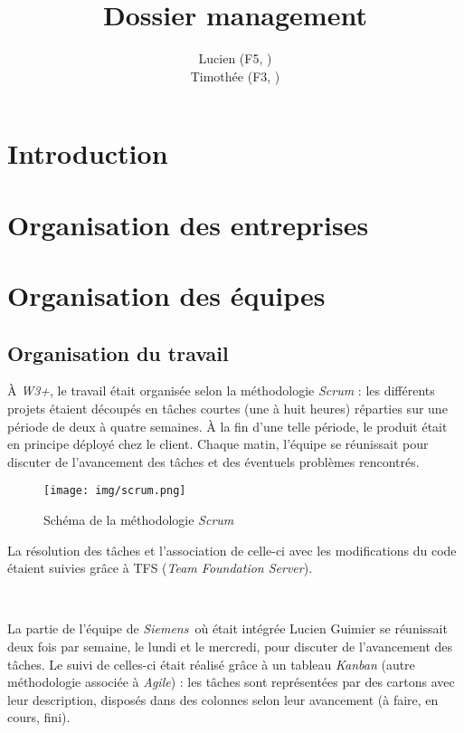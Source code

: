 \documentclass[a4paper, oneside, 12pt]{article}
\author{ Lucien \sc{Guimier} (F5, \siemens) \\ Timothée \sc{Hamon} (F3, \www) }
\title{Dossier management}
\newcommand\sectionSpeciale[1]{\addcontentsline{toc}{section}{#1}\section*{#1}}
\def\www{\emph{W3+}}
\def\siemens{\emph{Siemens}}
\begin{document}
\maketitle
\thispagestyle{empty}

\newpage
\setcounter{page}{1}
\sectionSpeciale{Introduction}

\vfill

\tableofcontents

\vfill

\newpage
\section{Organisation des entreprises}


\newpage
\section{Organisation des équipes}

\subsection{Organisation du travail}

À \www, le travail était organisée selon la méthodologie \emph{Scrum} : les différents projets étaient découpés en tâches courtes (une à huit heures) réparties sur une période de deux à quatre semaines. À la fin d’une telle période, le produit était en principe déployé chez le client. Chaque matin, l’équipe se réunissait pour discuter de l’avancement des tâches et des éventuels problèmes rencontrés.

\begin{figure}[H]
	\centering
	\texttt{[image: img/scrum.png]}
	\caption{Schéma de la méthodologie \emph{Scrum}}
\end{figure}

La résolution des tâches et l’association de celle-ci avec les modifications du code étaient suivies grâce à TFS (\emph{Team Foundation Server}).

\ 

La partie de l’équipe de \siemens\ où était intégrée Lucien {\sc Guimier} se réunissait deux fois par semaine, le lundi et le mercredi, pour discuter de l’avancement des tâches. Le suivi de celles-ci était réalisé grâce à un tableau \emph{Kanban} (autre méthodologie associée à \emph{Agile}) : les tâches sont représentées par des cartons avec leur description, disposés dans des colonnes selon leur avancement (à faire, en cours, fini).
\end{document}
